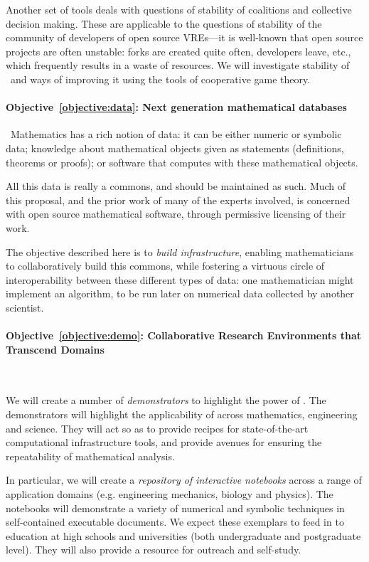 \documentclass[noworkareas,deliverables,\classoptions]{euproposal}       %
\begin{document}
\begin{proposal}
Another set of tools deals with questions of stability of coalitions and
collective decision making.  These are applicable to the questions of stability of
the community of developers  of open source VREs---it is well-known that 
open source projects are often unstable: forks are created quite often,
developers leave, etc., 
which frequently results in a waste of resources.
We will investigate stability of \TheProject\ and ways of improving it using the  tools
of cooperative game theory. 



\paragraph{Objective~\ref{objective:data}: Next generation mathematical databases}\ 
Mathematics has a rich notion of data: it can be either
numeric or symbolic data; knowledge about mathematical objects given as
statements (definitions, theorems or proofs); or software that computes
with these mathematical objects.

All this data is really a commons, and should be maintained as
such. Much of this proposal, and the prior work of many of the experts
involved, is concerned with open source mathematical software, through
permissive licensing of their work.

The objective described here is to \emph{build infrastructure},
enabling mathematicians to collaboratively build this commons, while
fostering a virtuous circle of interoperability between these different
types of data: one mathematician might implement an algorithm, to be
run later on numerical data collected by another scientist.

\paragraph{Objective~\ref{objective:demo}: Collaborative Research Environments that Transcend Domains}\ 


We will create a number of \emph{demonstrators} to highlight the power
of \TheProject{}. The demonstrators will highlight the applicability
of \TheProject{} across mathematics, engineering and science. They
will act so as to provide recipes for state-of-the-art computational
infrastructure tools, and provide avenues for ensuring the
repeatability of mathematical analysis.

In particular, we will create a \emph{repository of interactive
  notebooks} across a range of application domains (e.g. engineering
mechanics, biology and physics). The notebooks will demonstrate a
variety of numerical and symbolic techniques in self-contained
executable documents. We expect these exemplars to feed in to
education at high schools and universities (both undergraduate and
postgraduate level). They will also provide a resource for outreach
and self-study.


\end{proposal}
\end{document}
